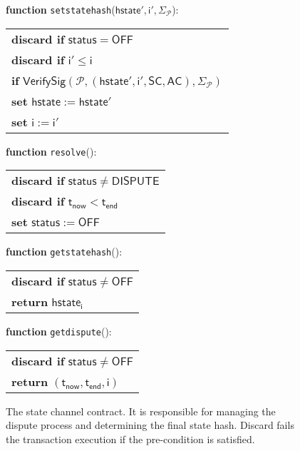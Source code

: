 \documentclass{llncs}
\newcommand{\chanstatus}{\mathsf{status}}
\newcommand{\chandispute}{\mathsf{DISPUTE}}
\newcommand{\chanoff}{\mathsf{OFF}}
\newcommand{\hstate}{\mathsf{hstate}}
\newcommand{\hstatei}{\mathsf{hstate}_{\monotoniccounter}}
\newcommand{\monotoniccounter}{\mathsf{i}}
\newcommand{\participant}{\mathcal{P}}
\newcommand{\statechannel}{\mathsf{SC}}
\newcommand{\verifysig}{\mathsf{VerifySig}}
\newcommand{\appcontract}{\mathsf{AC}}
\newcommand{\timenow}{\mathsf{t}_{\mathsf{now}}}
\newcommand{\timeend}{\mathsf{t}_{\mathsf{end}}}
\newcommand{\oninput}{\textcolor{entry}{\bf function }}
\newcommand{\stringlitt}[1]{\texttt{\textcolor{string}{#1}}}
\begin{document}
\begin{figure}[h]
\begin{boxedminipage}{\columnwidth}
\begin{tabular}{l}
		\end{tabular}
		
		
		\begin{flushleft}
			\oninput  \stringlitt{setstatehash}($\hstate', \monotoniccounter', \Sigma_{\participant}$):
		\end{flushleft}
		\begin{tabular}{l}
			\quad \textbf{discard if} $\chanstatus = \chanoff$ \\
			\quad \textbf{discard if} $\monotoniccounter' \leq \monotoniccounter$ \\
			\quad \textbf{if} $\verifysig(\participant, (\hstate', \monotoniccounter', \statechannel, \appcontract), \Sigma_{\participant})$ \\
			\quad \quad \textbf{set} $\hstate := \hstate'$ \\
			\quad \quad \textbf{set} $\monotoniccounter := \monotoniccounter'$ \\
		\end{tabular}
		
		\begin{flushleft} 
			\oninput \stringlitt{resolve}(): 
		\end{flushleft}
		\begin{tabular}{l}
		\quad \textbf{discard if} $\chanstatus \neq \chandispute$ \\
		\quad \textbf{discard if} $\timenow < \timeend$ \\
		\quad \textbf{set} $\chanstatus := \chanoff$ 
		\end{tabular}
	
		\begin{flushleft} 
		\oninput \stringlitt{getstatehash}(): 
		\end{flushleft}
		\begin{tabular}{l}
		\quad \textbf{discard if} $\chanstatus \neq \chanoff$ \\
		\quad \textbf{return} $\hstatei$
		\end{tabular}
		
		\begin{flushleft} 
			\oninput \stringlitt{getdispute}(): 
		\end{flushleft}
		\begin{tabular}{l}
			\quad \textbf{discard if} $\chanstatus \neq \chanoff$ \\
			\quad \textbf{return} $(\timenow, \timeend, \monotoniccounter)$
		\end{tabular}
	\end{boxedminipage}
	\caption{The state channel contract. It is responsible for managing the dispute process and determining the final state hash.  Discard fails the transaction execution if the pre-condition is satisfied.} \label{fig:statechannel}
\end{figure}
\end{document}
